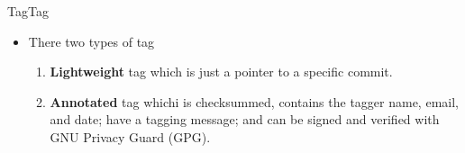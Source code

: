 \begin{frame}{Tag}{Tag}
\begin{itemize}
\item There two types of tag
\begin{enumerate}
  \item \textbf{Lightweight} tag which is just a pointer to a specific commit.
  \item \textbf{Annotated} tag whichi is checksummed, contains the tagger name, email, and date; have a tagging message; and can be signed and verified with GNU Privacy Guard (GPG). 
\end{enumerate}
\end{itemize}
\end{frame}
